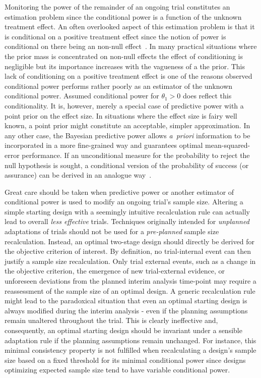 \documentclass{article}
\begin{document}
Monitoring the power of the remainder of an ongoing trial constitutes an estimation problem since the conditional power
is a function of the unknown treatment effect. 
An often overlooked aspect of this estimation problem is that it is 
conditional on a positive treatment effect since the notion of power is conditional on there being an non-null effect~\citep{kunzmann2020}.
In many practical situations where the prior mass is concentrated on 
non-null effects the effect of conditioning is negligible but its importance increases with the vagueness of a the prior. 
This lack of conditioning on a positive treatment effect is one of the reasons observed conditional power performs rather poorly as an estimator of the unknown conditional power.
Assumed conditional power for $\theta_1>0$ does reflect this conditionality.
It is, however,
merely a special case of predictive power with a 
point prior on the effect size.
In situations where the effect size is fairy well known, a point prior might constitute an acceptable, simpler approximation.
In any other case, the Bayesian predictive power allows \textit{a~priori} information to be incorporated in a more fine-grained way and
guarantees optimal mean-squared-error performance.
If an unconditional measure for the probability to reject the null hypothesis is sought, 
a conditional version of the probability of success (or assurance) can be derived in an analogue way~\citep{kunzmann2020}.

Great care should be taken when predictive power 
or another estimator of conditional power
is used to modify an ongoing trial's sample size.
Altering a simple starting design with a seemingly intuitive recalculation rule 
can actually lead to overall \emph{less effective} trials.
Techniques originally intended for \emph{unplanned} adaptations of trials 
should not be used for a \emph{pre-planned} sample size recalculation.
Instead, an optimal two-stage design should directly be derived 
for the objective criterion of interest.
By definition, no trial-internal event can then justify a sample size recalculation.
Only trial external events, such as a change in the objective criterion,
the emergence of new trial-external evidence,
or unforeseen deviations from the planned interim analysis time-point
may require a reassessment of the sample size of an optimal design.
A generic recalculation rule might lead to the paradoxical situation that even an optimal
starting design is always modified during the interim analysis 
- even if the planning assumptions remain unaltered throughout the trial.
This is clearly ineffective and, consequently, 
an optimal starting design should be invariant under a sensible adaptation rule 
if the planning assumptions remain unchanged.
For instance, this minimal consistency property is not fulfilled when recalculating a design's
sample size based on a fixed threshold for its minimal conditional power 
since designs optimizing expected sample size tend to have variable conditional power.
\end{document}
